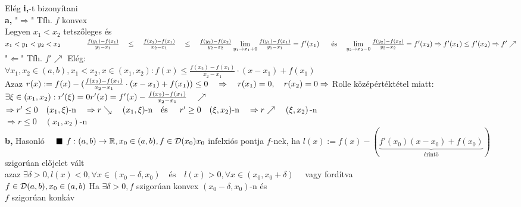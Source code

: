 \documentclass[a4paper,11pt]{article}
\begin{document}
\biz Elég \textbf{i,}-t bizonyítani\\[0.1cm]\hspace*{0.5cm}\textbf{a,}
"$\Rightarrow$" Tfh. $f$ konvex\\[0.1cm]Legyen $x_1<x_2$ tetszőleges és 
$x_1<y_1<y_2<x_2\\[0.2cm]\hspace*{1.3cm}\frac{f(y_1)-f(x_1)}{y_1-x_1}\quad
\leq\quad\frac{f(x_2)-f(x_1)}{x_2-x_1}\quad\leq\quad\frac{f(y_2)-f(x_2)}
{y_2-x_2}\\[0.2cm]\lim\limits_{y_1\to x_1+0}\frac{f(y_1)-f(x_1)}{y_1-x_1}=
f'(x_1)\hspace{0.6cm}\text{és}\hspace{0.4cm}\lim\limits_
{y_2\to x_2-0}\frac{f(y_2)-f(x_2)}{y_2-x_2}=f'(x_2)
\Rightarrow f'(x_1)\leq f'(x_2)\Rightarrow f'\nearrow$\\[0.2cm]
"$\Leftarrow$" Tfh. $f'\nearrow$ Elég:\\[0.2cm]
$\forall x_1,x_2\in(a,b),x_1<x_2,x\in(x_1,x_2):f(x)\leq\frac{f(x_2)-f(x_1)}
{x_2-x_1}\cdot(x-x_1)+f(x_1)$\\[0.1cm]Azaz 
$r(x):=f(x)-(\frac{f(x_2)-f(x_1)}{x_2-x_1}\cdot(x-x_1)+f(x_1))\leq0
\quad\Rightarrow\quad r(x_1)=0,\quad r(x_2)=0\\[0.2cm]\Rightarrow$
Rolle középértéktétel miatt: $\exists\xi\in(x_1,x_2):r'(\xi)=0\\[0.2cm]
r'(x)=f'(x)-\frac{f(x_2)-f(x_1)}{x_2-x_1}\quad\nearrow$\\[0.2cm]
$\Rightarrow r'\leq0\quad(x_1,\xi)\text{-n}\quad\Rightarrow r\searrow
\quad(x_1,\xi)\text{-n\quad és}\\[0.1cm]\hspace*{0.5cm}r'\geq0\quad(\xi,x_2)
\text{-n}\quad\Rightarrow r\nearrow\quad(\xi,x_2)$-n\\[0.2cm]
$\Rightarrow r\leq0\quad(x_1,x_2)\text{-n}$\\[0.2cm]
\hspace*{0.5cm}\textbf{b,} Hasonló $\quad\blacksquare$\newpage
{} $f:(a,b)\to\mathbb{R},x_0\in(a,b),f\in\mathcal{D}(x_0)\\[0.2cm]x_0$ infelxiós pontja $f$-nek, ha
$l(x):=f(x)-(\underbrace{f'(x_0)(x-x_0)+f(x_0)}_{\text{érintő}})\quad$
szigorúan előjelet vált\\[0.2cm]azaz $\exists\delta>0,l(x)<0,\forall x\in
(x_0-\delta,x_0)\quad\text{és}\quad l(x)>0,\forall x\in(x_0,x_0+\delta)\quad$
vagy fordítva\\[0.2cm]\tetel $f\in\mathcal{D}(a,b),x_0\in(a,b)$ Ha $\exists\delta>0,f$
szigorúan konvex $(x_0-\delta,x_0)$-n és \\[0.1cm]$f$ szigorúan konkáv
\end{document}
